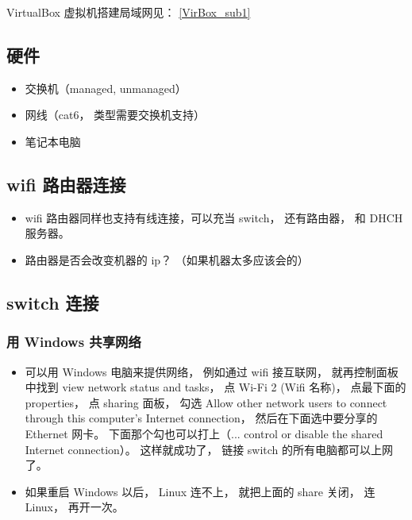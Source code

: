 
\begin{issues}
\issueDraft
\end{issues}


VirtualBox 虚拟机搭建局域网见： \autoref{VirBox_sub1}~

\subsection{硬件}
\begin{itemize}
\item 交换机（managed, unmanaged）
\item 网线（cat6， 类型需要交换机支持）
\item 笔记本电脑
\end{itemize}

\subsection{wifi 路由器连接}
\begin{itemize}
\item wifi 路由器同样也支持有线连接，可以充当 switch， 还有路由器， 和 DHCH 服务器。
\item 路由器是否会改变机器的 ip？ （如果机器太多应该会的）
\end{itemize}

\subsection{switch 连接}
\subsubsection{用 Windows 共享网络}
\begin{itemize}
\item 可以用 Windows 电脑来提供网络， 例如通过 wifi 接互联网， 就再控制面板中找到 view network status and tasks， 点 Wi-Fi 2 (Wifi 名称)， 点最下面的 properties， 点 sharing 面板， 勾选 Allow other network users to connect through this computer's Internet connection， 然后在下面选中要分享的 Ethernet 网卡。 下面那个勾也可以打上（... control or disable the shared Internet connection）。 这样就成功了， 链接 switch 的所有电脑都可以上网了。
\item 如果重启 Windows 以后， Linux 连不上， 就把上面的 share 关闭， 连 Linux， 再开一次。
\end{itemize}

